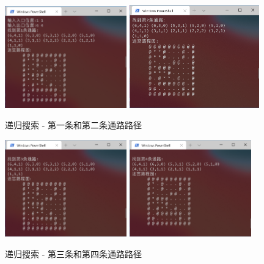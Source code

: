 \documentclass{ctexart}
\begin{document}
    \begin{figure}[h]
        \centering
        \includegraphics[width=0.47\textwidth]{测试结果2.png}
        \includegraphics[width=0.5\textwidth]{测试结果3.png}
        \caption{递归搜索 - 第一条和第二条通路路径}
        \label{img:test3}
    \end{figure}
    \begin{figure}[h]
        \centering
        \includegraphics[width=0.47\textwidth]{测试结果4.png}
        \includegraphics[width=0.47\textwidth]{测试结果5.png}
        \caption{递归搜索 - 第三条和第四条通路路径}
        \label{img:test4}
    \end{figure}
\end{document}

